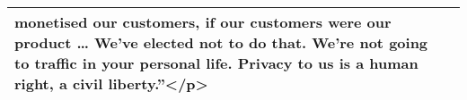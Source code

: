 \documentclass[]{article}
\begin{document}
\begin{table}[!h]
{\begin{tabular}[t]{ll}
monetised our customers, if our customers were our product … We’ve elected not to do that. We’re not going to traffic in your personal life. Privacy to us is a human right, a civil liberty.”</p>\\
\bottomrule
\end{tabular}}
\end{table}



\begin{table}[!h]

\caption{\label{tab:data_collection}Table containing CRIME  News}
\centering
{}
\end{table}
\end{document}
